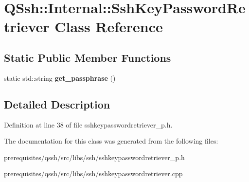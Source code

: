 \hypertarget{class_q_ssh_1_1_internal_1_1_ssh_key_password_retriever}{}\section{Q\+Ssh\+:\+:Internal\+:\+:Ssh\+Key\+Password\+Retriever Class Reference}
\label{class_q_ssh_1_1_internal_1_1_ssh_key_password_retriever}
\subsection*{Static Public Member Functions}
\begin{DoxyCompactItemize}
\item 
\mbox{\label{class_q_ssh_1_1_internal_1_1_ssh_key_password_retriever_acf5af9e81c6fb4ac1436cb7460d5ce38}} 
static std\+::string {\bfseries get\+\_\+passphrase} ()
\end{DoxyCompactItemize}


\subsection{Detailed Description}


Definition at line 38 of file sshkeypasswordretriever\+\_\+p.\+h.



The documentation for this class was generated from the following files\+:\begin{DoxyCompactItemize}
\item 
prerequisites/qssh/src/libs/ssh/sshkeypasswordretriever\+\_\+p.\+h\item 
prerequisites/qssh/src/libs/ssh/sshkeypasswordretriever.\+cpp\end{DoxyCompactItemize}
